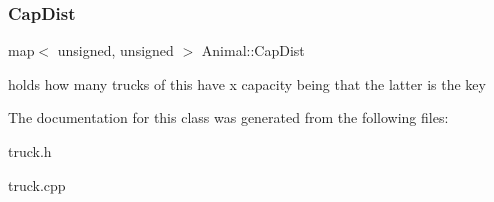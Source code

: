 \subsubsection{\texorpdfstring{Cap\+Dist}{CapDist}}
{\footnotesize\ttfamily map$<$ unsigned, unsigned $>$ Animal\+::\+Cap\+Dist\hspace{0.3cm}{\ttfamily [static]}}

holds how many trucks of this have x capacity being that the latter is the key 

The documentation for this class was generated from the following files\+:\begin{DoxyCompactItemize}
\item 
truck.\+h\item 
truck.\+cpp\end{DoxyCompactItemize}

